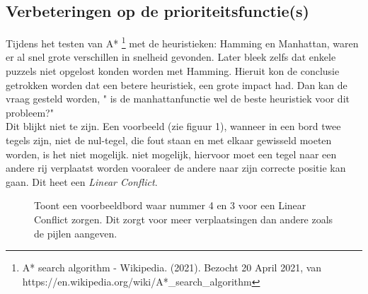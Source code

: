 \documentclass[a4paper]{article}
\numberwithin{equation}{section}
\begin{document}
    \pagebreak

        \subsection{Verbeteringen op de prioriteitsfunctie(s)}
        Tijdens het testen van A* \footnote{A* search algorithm - Wikipedia. (2021). Bezocht 20 April 2021, van https://en.wikipedia.org/wiki/A*\_search\_algorithm}
        met de heuristieken: Hamming en Manhattan, waren er al snel grote verschillen in snelheid gevonden. Later bleek zelfs dat enkele puzzels niet opgelost konden worden met Hamming. 
        Hieruit kon de conclusie getrokken worden dat een betere heuristiek, een grote impact had. Dan kan de vraag gesteld worden, " is de manhattanfunctie wel de beste heuristiek voor dit probleem?"
        \\Dit blijkt niet te zijn. Een voorbeeld (zie figuur 1), wanneer in een bord twee tegels zijn, niet de nul-tegel, die fout staan en met elkaar gewisseld moeten worden, is het niet mogelijk.
        niet mogelijk, hiervoor moet een tegel naar een andere rij verplaatst worden vooraleer de andere naar zijn correcte positie kan gaan. Dit heet een \textit{Linear Conflict}.
       
        \begin{figure}[ht]

            \center

            \caption[Voorbeeld van Linear Conflict]{Toont een voorbeeldbord waar nummer 4 en 3 voor een Linear Conflict zorgen. Dit zorgt voor meer verplaatsingen dan andere zoals de pijlen aangeven.}
            \label{fig:Linear Conflicts}
        \end{figure}
\end{document}

